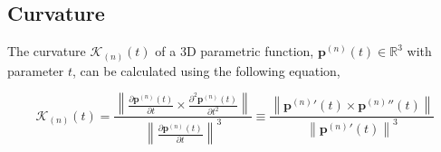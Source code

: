 \subsection{Curvature}
\label{sec:curvaturepn}
The curvature $\mathcal{K}_{(n)}(t)$ of a 3D parametric function, 
$\mathbf{p}^{(n)}(t)\in \mathbb{R}^{3}$ with parameter $t$, 
can be calculated 
\cite[pp. 21]{toponogov2006differential} 
using the following equation,

\begin{equation}\label{eq:curvaturekn}
\mathcal{K}_{(n)}(t)
=
\frac{\left\|\frac{\partial \mathbf{p}^{(n)}(t)}{\partial t} \times \frac{\partial^2 \mathbf{p}^{(n)}(t)}{\partial t^2} \right\|}
{\left\|\frac{\partial \mathbf{p}^{(n)}(t)}{\partial t}\right\|^{3}}
\equiv
\frac{\left\|{\mathbf{p}^{(n)}}'(t) \times {\mathbf{p}^{(n)}}''(t) \right\|}
{\left\|{\mathbf{p}^{(n)}}'(t)\right\|^{3}}
\end{equation}